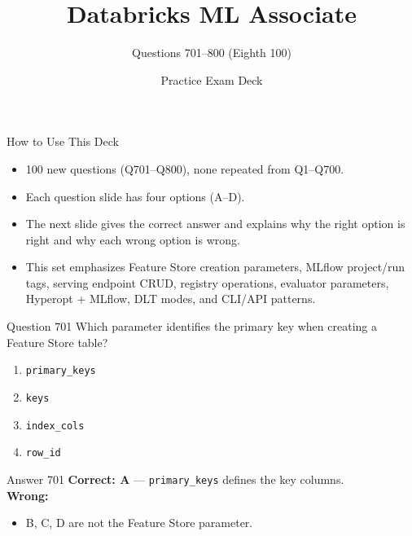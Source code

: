 \documentclass[aspectratio=169,11pt]{beamer}
\title{Databricks ML Associate}
\subtitle{Questions 701--800 (Eighth 100)}
\author{Practice Exam Deck}
\date{}
\begin{document}
	
	\begin{frame}
		\titlepage
	\end{frame}
	
	\begin{frame}{How to Use This Deck}
		\begin{itemize}
			\item 100 new questions (Q701--Q800), none repeated from Q1--Q700.
			\item Each question slide has four options (A--D).
			\item The next slide gives the correct answer and explains why the right option is right and why each wrong option is wrong.
			\item This set emphasizes Feature Store creation parameters, MLflow project/run tags, serving endpoint CRUD, registry operations, evaluator parameters, Hyperopt + MLflow, DLT modes, and CLI/API patterns.
		\end{itemize}
	\end{frame}
	
	\begin{frame}{Question 701}
		Which parameter identifies the primary key when creating a Feature Store table?
		\begin{enumerate}[label=\Alph*.]
			\item \texttt{primary\_keys}
			\item \texttt{keys}
			\item \texttt{index\_cols}
			\item \texttt{row\_id}
		\end{enumerate}
	\end{frame}
	\begin{frame}{Answer 701}
		\textbf{Correct: A} --- \texttt{primary\_keys} defines the key columns.\\
		\vspace{0.5em}
		\textbf{Wrong:}
		\begin{itemize}
			\item B, C, D are not the Feature Store parameter.
		\end{itemize}
	\end{frame}
	
\end{document}
